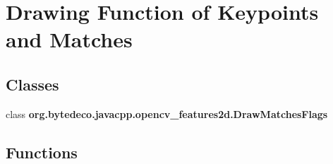 \hypertarget{group__features2d__draw}{}\section{Drawing Function of Keypoints and Matches}
\label{group__features2d__draw}
\subsection*{Classes}
\begin{DoxyCompactItemize}
\item 
class {\bfseries org.\+bytedeco.\+javacpp.\+opencv\+\_\+features2d.\+Draw\+Matches\+Flags}
\end{DoxyCompactItemize}
\subsection*{Functions}
